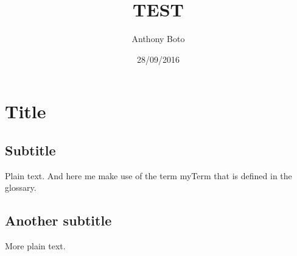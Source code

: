 \documentclass{article}
\begin{document}
\title {TEST}
\author{Anthony Boto}
\date {28/09/2016}
\maketitle

\section{Title}
\subsection{Subtitle}
Plain text.
And here me make use of the term \gls{myTerm} that is defined in the
glossary.
\subsection{Another subtitle}
More plain text.
\glsaddall
\printglossaries
\end{document}
